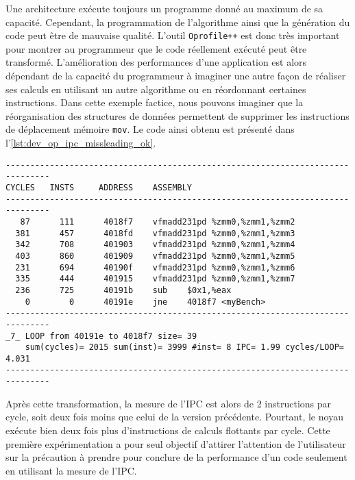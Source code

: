         Une architecture exécute toujours un programme donné au maximum de sa capacité. Cependant, la programmation de l'algorithme ainsi que la génération du code peut être de mauvaise qualité. L'outil \verb=Oprofile++= est donc très important pour montrer au programmeur que le code réellement exécuté peut être transformé. L'amélioration des performances d'une application est alors dépendant de la capacité du programmeur à imaginer une autre façon de réaliser ses calculs en utilisant un autre algorithme ou en réordonnant certaines instructions. Dans cette exemple factice, nous pouvons imaginer que la réorganisation des structures de données permettent de supprimer les instructions de déplacement mémoire \verb=mov=. Le code ainsi obtenu est présenté dans  l'\autoref{lst:dev_op_ipc_missleading_ok}. 
    
\begin{lstlisting}[label=lst:dev_op_ipc_missleading_ok, caption=Noyau de calcul exécutant deux opérations de calcul par cycle.]
-------------------------------------------------------------------------------
CYCLES   INSTS     ADDRESS    ASSEMBLY                         
-------------------------------------------------------------------------------
   87      111      4018f7    vfmadd231pd %zmm0,%zmm1,%zmm2
  381      457      4018fd    vfmadd231pd %zmm0,%zmm1,%zmm3
  342      708      401903    vfmadd231pd %zmm0,%zmm1,%zmm4
  403      860      401909    vfmadd231pd %zmm0,%zmm1,%zmm5
  231      694      40190f    vfmadd231pd %zmm0,%zmm1,%zmm6
  335      444      401915    vfmadd231pd %zmm0,%zmm1,%zmm7
  236      725      40191b    sub    $0x1,%eax
    0        0      40191e    jne    4018f7 <myBench>
-------------------------------------------------------------------------------
_7_ LOOP from 40191e to 4018f7 size= 39
    sum(cycles)= 2015 sum(inst)= 3999 #inst= 8 IPC= 1.99 cycles/LOOP= 4.031
-------------------------------------------------------------------------------
\end{lstlisting}

        Après cette transformation, la mesure de l'IPC est alors de 2 instructions par cycle, soit deux fois moins que celui de la version précédente. Pourtant, le noyau exécute bien deux fois plus d'instructions de calculs flottants par cycle. Cette première expérimentation a pour seul objectif d'attirer l'attention de l'utilisateur sur la précaution à prendre pour conclure de la performance d'un code seulement en utilisant la mesure de l'IPC. 
        


